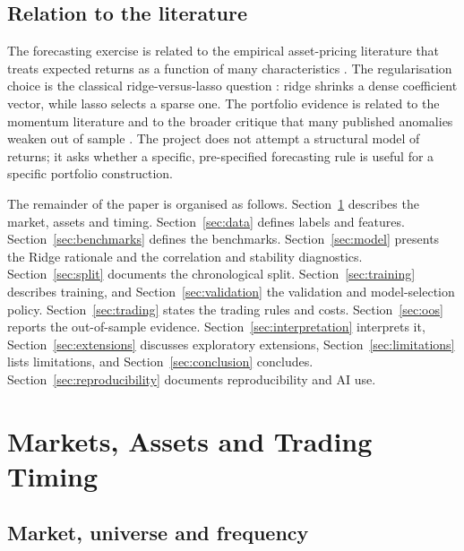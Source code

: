 \documentclass[11pt,a4paper]{article}
\begin{document}
\subsection{Relation to the literature}

The forecasting exercise is related to the empirical asset-pricing literature that treats expected returns as a function of many characteristics \citep{gu2020, kelly2019, freyberger2020}. The regularisation choice is the classical ridge-versus-lasso question \citep{hoerl1970, tibshirani1996}: ridge shrinks a dense coefficient vector, while lasso selects a sparse one. The portfolio evidence is related to the momentum literature \citep{jegadeesh1993, asness2013, moskowitz2012} and to the broader critique that many published anomalies weaken out of sample \citep{mclean2016, hou2020}. The project does not attempt a structural model of returns; it asks whether a specific, pre-specified forecasting rule is useful for a specific portfolio construction.

The remainder of the paper is organised as follows. Section~\ref{sec:markets} describes the market, assets and timing. Section~\ref{sec:data} defines labels and features. Section~\ref{sec:benchmarks} defines the benchmarks. Section~\ref{sec:model} presents the Ridge rationale and the correlation and stability diagnostics. Section~\ref{sec:split} documents the chronological split. Section~\ref{sec:training} describes training, and Section~\ref{sec:validation} the validation and model-selection policy. Section~\ref{sec:trading} states the trading rules and costs. Section~\ref{sec:oos} reports the out-of-sample evidence. Section~\ref{sec:interpretation} interprets it, Section~\ref{sec:extensions} discusses exploratory extensions, Section~\ref{sec:limitations} lists limitations, and Section~\ref{sec:conclusion} concludes. Section~\ref{sec:reproducibility} documents reproducibility and AI use.


\section{Markets, Assets and Trading Timing}
\label{sec:markets}

\subsection{Market, universe and frequency}
\end{document}
